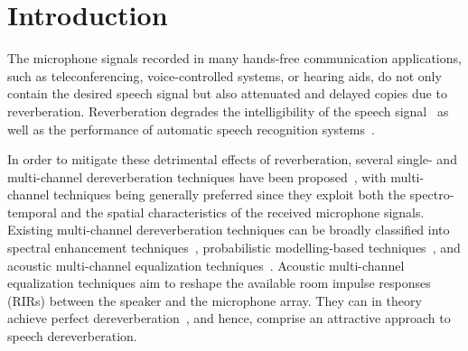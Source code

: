 \documentclass[twocolumn]{bmcart}%
\begin{document}
\section{Introduction}
The microphone signals recorded in many hands-free communication applications, such as teleconferencing, voice-controlled systems, or hearing aids, do not only contain the desired speech signal but also attenuated and delayed copies due to reverberation.
Reverberation degrades the intelligibility of the speech signal~\cite{Beutelmann_2006,Warzybok_IWAENC_2014} as well as the performance of automatic speech recognition systems~\cite{Yoshioka_ISPM_2012,Xiong_EURASIP_2015}.

In order to mitigate these detrimental effects of reverberation, several single- and multi-channel dereverberation techniques have been proposed~\cite{Naylor_Derev_book}, with multi-channel techniques being generally preferred since they exploit both the spectro-temporal and the spatial characteristics of the received microphone signals.
Existing multi-channel dereverberation techniques can be broadly classified into spectral enhancement techniques~\cite{Lebart_ACUSTICA_2001,Habets2009a,Braun_EURASIP_2015,Kuklasinski_ITASLP_2016}, probabilistic modelling-based techniques~\cite{Nakatani_ITASLP_2010,Schmid_ITASLP_2014,Schwartz_ITASLP_2015,Jukic_ITASLP_2015}, and acoustic multi-channel equalization techniques~\cite{Miyoshi_ITASS_1988, Kallinger_ICASSP_2006,Jungmann_ITASLP_2012, Hikichi_EURASIP_2007, Lim_ITASLP_2014, Kodrasi_ITASLP_2013, Rashobh_ITASLP_2014}.
Acoustic multi-channel equalization techniques aim to reshape the available room impulse responses (RIRs) between the speaker and the microphone array.
They can in theory achieve perfect dereverberation~\cite{Miyoshi_ITASS_1988,Hacihabibouglu_ITASLP_2012}, and hence, comprise an attractive approach to speech dereverberation.
\end{document}

